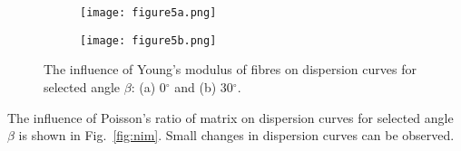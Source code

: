\documentclass[preprint,12pt]{elsarticle}
\begin{document}
\begin{figure} [h!]
	\centering
	\begin{subfigure}[b]{0.49\textwidth}
		\centering
		\texttt{[image: figure5a.png]}
		\caption{}
		\label{fig:ef0}
	\end{subfigure}
	\hfill
	\begin{subfigure}[b]{0.49\textwidth}
		\centering
		\texttt{[image: figure5b.png]}
		\caption{}
		\label{fig:ef30}
	\end{subfigure}
		\caption{The influence of Young's modulus of fibres on dispersion curves for 
		selected angle \(\beta\): (a) 0\(^{\circ}\) and (b) 30\(^{\circ}\).} 
	\label{fig:ef}
\end{figure}

The influence of  Poisson's ratio of matrix on dispersion curves for selected angle 
\(\beta\) is shown in Fig.~\ref{fig:nim}. Small changes in dispersion curves can be 
observed.
\end{document}
